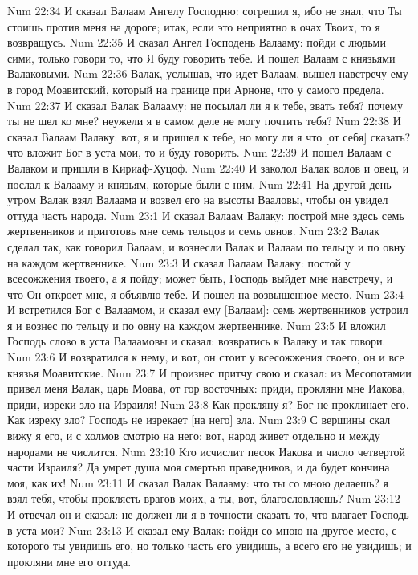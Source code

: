Num 22:34  И сказал Валаам Ангелу Господню: согрешил я, ибо не знал, что Ты стоишь против меня на дороге; итак, если это неприятно в очах Твоих, то я возвращусь.
Num 22:35  И сказал Ангел Господень Валааму: пойди с людьми сими, только говори то, что Я буду говорить тебе. И пошел Валаам с князьями Валаковыми.
Num 22:36  Валак, услышав, что идет Валаам, вышел навстречу ему в город Моавитский, который на границе при Арноне, что у самого предела.
Num 22:37  И сказал Валак Валааму: не посылал ли я к тебе, звать тебя? почему ты не шел ко мне? неужели я в самом деле не могу почтить тебя?
Num 22:38  И сказал Валаам Валаку: вот, я и пришел к тебе, но могу ли я что [от себя] сказать? что вложит Бог в уста мои, то и буду говорить.
Num 22:39  И пошел Валаам с Валаком и пришли в Кириаф-Хуцоф.
Num 22:40  И заколол Валак волов и овец, и послал к Валааму и князьям, которые были с ним.
Num 22:41  На другой день утром Валак взял Валаама и возвел его на высоты Вааловы, чтобы он увидел оттуда часть народа.
Num 23:1  И сказал Валаам Валаку: построй мне здесь семь жертвенников и приготовь мне семь тельцов и семь овнов.
Num 23:2  Валак сделал так, как говорил Валаам, и вознесли Валак и Валаам по тельцу и по овну на каждом жертвеннике.
Num 23:3  И сказал Валаам Валаку: постой у всесожжения твоего, а я пойду; может быть, Господь выйдет мне навстречу, и что Он откроет мне, я объявлю тебе. И пошел на возвышенное место.
Num 23:4  И встретился Бог с Валаамом, и сказал ему [Валаам]: семь жертвенников устроил я и вознес по тельцу и по овну на каждом жертвеннике.
Num 23:5  И вложил Господь слово в уста Валаамовы и сказал: возвратись к Валаку и так говори.
Num 23:6  И возвратился к нему, и вот, он стоит у всесожжения своего, он и все князья Моавитские.
Num 23:7  И произнес притчу свою и сказал: из Месопотамии привел меня Валак, царь Моава, от гор восточных: приди, прокляни мне Иакова, приди, изреки зло на Израиля!
Num 23:8  Как прокляну я? Бог не проклинает его. Как изреку зло? Господь не изрекает [на него] зла.
Num 23:9  С вершины скал вижу я его, и с холмов смотрю на него: вот, народ живет отдельно и между народами не числится.
Num 23:10  Кто исчислит песок Иакова и число четвертой части Израиля? Да умрет душа моя смертью праведников, и да будет кончина моя, как их!
Num 23:11  И сказал Валак Валааму: что ты со мною делаешь? я взял тебя, чтобы проклясть врагов моих, а ты, вот, благословляешь?
Num 23:12  И отвечал он и сказал: не должен ли я в точности сказать то, что влагает Господь в уста мои?
Num 23:13  И сказал ему Валак: пойди со мною на другое место, с которого ты увидишь его, но только часть его увидишь, а всего его не увидишь; и прокляни мне его оттуда.
